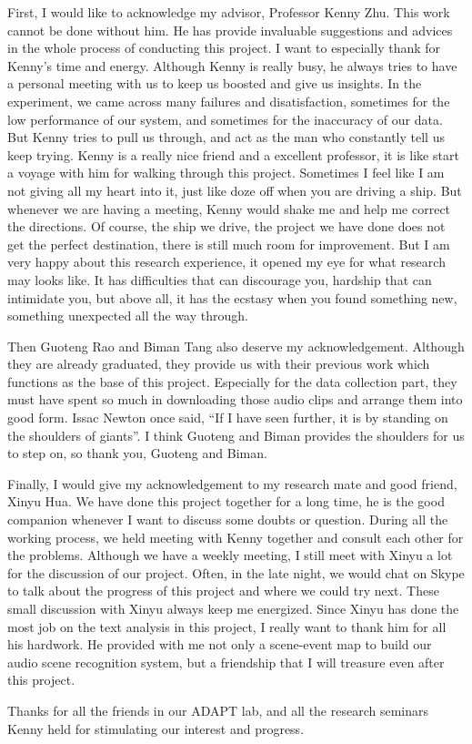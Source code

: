 
\begin{thanks}
First, I would like to acknowledge my advisor, Professor Kenny Zhu. 
This work cannot be done without him. 
He has provide invaluable suggestions and advices in the whole process of conducting this project. 
I want to especially thank for Kenny's time and energy.
Although Kenny is really busy, he always tries to have a personal meeting with us to keep us boosted and give us insights.  
In the experiment, we came across many failures and disatisfaction, sometimes for the low performance of our system, and sometimes for the inaccuracy of our data. 
But Kenny tries to pull us through, and act as the man who constantly tell us keep trying. 
Kenny is a really nice friend and a excellent professor, it is like start a voyage with him for walking through this project. 
Sometimes I feel like I am not giving all my heart into it, just like doze off when you are driving a ship. 
But whenever we are having a meeting, Kenny would shake me and help me correct the directions. 
Of course, the ship we drive, the project we have done does not get the perfect destination, there is still much room for improvement. 
But I am very happy about this research experience, it opened my eye for what research may looks like. 
It has difficulties that can discourage you, hardship that can intimidate you, but above all, it has the ecstasy when you found something new, something unexpected all the way through.  

Then Guoteng Rao and Biman Tang also deserve my acknowledgement. 
Although they are already graduated, they provide us with their previous work which functions as the base of this project. 
Especially for the data collection part, they must have spent so much in downloading those audio clips and arrange them into good form. 
Issac Newton once said, ``If I have seen further, it is by standing on the shoulders of giants''. 
I think Guoteng and Biman provides the shoulders for us to step on, so thank you, Guoteng and Biman. 

Finally, I would give my acknowledgement to my research mate and good friend, Xinyu Hua. 
We have done this project together for a long time, he is the good companion whenever I want to discuss some doubts or question. 
During all the working process, we held meeting with Kenny together and consult each other for the problems. 
Although we have a weekly meeting, I still meet with Xinyu a lot for the discussion of our project. 
Often, in the late night, we would chat on Skype to talk about the progress of this project and where we could try next. 
These small discussion with Xinyu always keep me energized. 
Since Xinyu has done the most job on the text analysis in this project, I really want to thank him for all his hardwork. 
He provided with me not only a scene-event map to build our audio scene recognition system, but a friendship that I will treasure even after this project. 

Thanks for all the friends in our ADAPT lab, and all the research seminars Kenny held for stimulating our interest and progress.   
 

\end{thanks}
